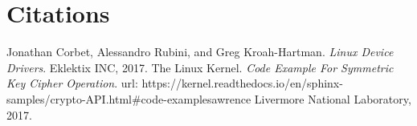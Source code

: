 \section{Citations}
\begin{thebibliography}{9}
      Jonathan Corbet, Alessandro Rubini, and Greg Kroah-Hartman.
      \textit{Linux Device Drivers}.
      Eklektix INC, 2017.
      The Linux Kernel.
      \textit{Code Example For Symmetric Key Cipher Operation}.
      url: https://kernel.readthedocs.io/en/sphinx-samples/crypto-API.html#code-examplesawrence Livermore National Laboratory, 2017.   
\end{thebibliography}

